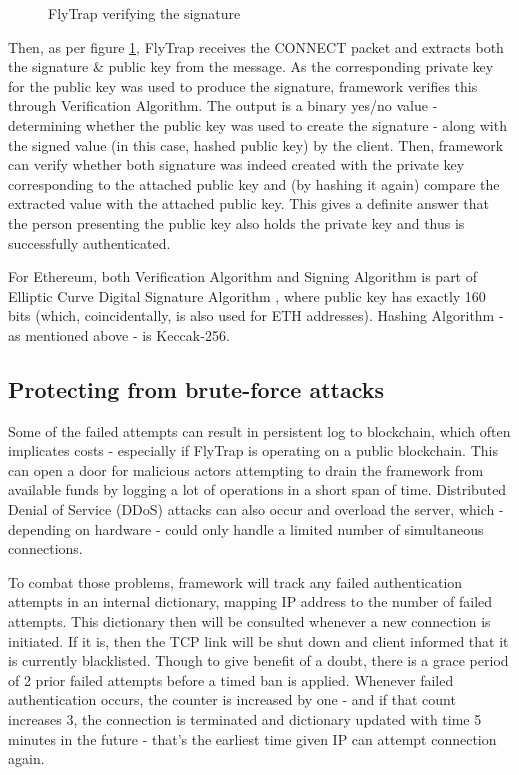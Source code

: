 \begin{figure}[h]
    \centering
    \caption{FlyTrap verifying the signature}
    \label{fig:verify}
\end{figure}

Then, as per figure \ref{fig:verify}, FlyTrap receives the CONNECT packet and extracts both the signature \& public key from the message. As the corresponding private key for the public key was used to produce the signature, framework verifies this through Verification Algorithm. The output is a binary yes/no value - determining whether the public key was used to create the signature - along with the signed value (in this case, hashed public key) by the client. Then, framework can verify whether both signature was indeed created with the private key corresponding to the attached public key and (by hashing it again) compare the extracted value with the attached public key. This gives a definite answer that the person presenting the public key also holds the private key and thus is successfully authenticated.

For Ethereum, both Verification Algorithm and Signing Algorithm is part of Elliptic Curve Digital Signature Algorithm \citep{johnson2001elliptic}, where public key has exactly 160 bits (which, coincidentally, is also used for ETH addresses). Hashing Algorithm - as mentioned above - is Keccak-256.
\subsection{Protecting from brute-force attacks}
Some of the failed attempts can result in persistent log to blockchain, which often implicates costs - especially if FlyTrap is operating on a public blockchain. This can open a door for malicious actors attempting to drain the framework from available funds by logging a lot of operations in a short span of time. Distributed Denial of Service (DDoS) attacks can also occur and overload the server, which - depending on hardware - could only handle a limited number of simultaneous connections.

To combat those problems, framework will track any failed authentication attempts in an internal dictionary, mapping IP address to the number of failed attempts. This dictionary then will be consulted whenever a new connection is initiated. If it is, then the TCP link will be shut down and client informed that it is currently blacklisted. Though to give benefit of a doubt, there is a grace period of 2 prior failed attempts before a timed ban is applied. Whenever failed authentication occurs, the counter is increased by one - and if that count increases 3, the connection is terminated and dictionary updated with time 5 minutes in the future - that's the earliest time given IP can attempt connection again.
